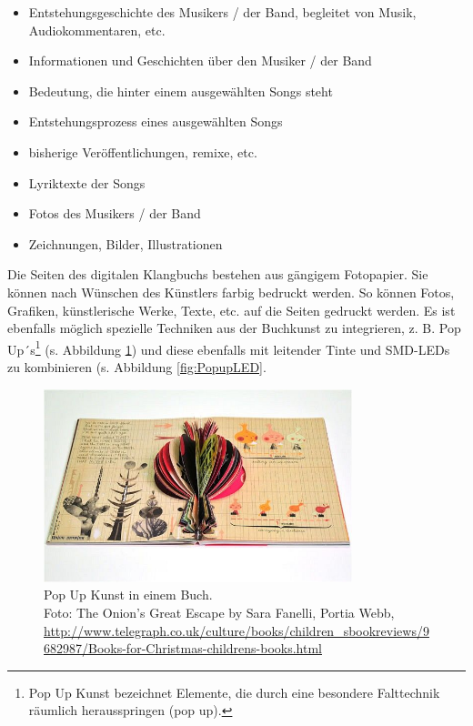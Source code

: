 \begin{itemize}
\item Entstehungsgeschichte des Musikers / der Band, begleitet von Musik, Audiokommentaren, etc.
\item Informationen und Geschichten über den Musiker / der Band
\item Bedeutung, die hinter einem ausgewählten Songs steht
\item Entstehungsprozess eines ausgewählten Songs
\item bisherige Veröffentlichungen, \gls{remix}e, etc.
\item Lyriktexte der Songs
\item Fotos des Musikers / der Band
\item Zeichnungen, Bilder, Illustrationen
\end{itemize}

Die Seiten des digitalen Klangbuchs bestehen aus gängigem Fotopapier. Sie können nach Wünschen des Künstlers farbig bedruckt werden. So können Fotos, Grafiken, künstlerische Werke, Texte, etc. auf die Seiten gedruckt werden. Es ist ebenfalls möglich spezielle Techniken aus der Buchkunst zu integrieren, z. B. Pop Up´s\footnote{Pop Up Kunst bezeichnet Elemente, die durch eine besondere Falttechnik räumlich herausspringen (pop up).} (s. Abbildung \ref{fig:Popup}) und diese ebenfalls mit leitender Tinte und SMD-LEDs zu kombinieren (s. Abbildung \ref{fig:PopupLED}.\\


\begin{figure}[H]
\centering
\includegraphics[width=0.8\textwidth]{grafiken/popup.jpg}
\caption{Pop Up Kunst in einem Buch.\\Foto: The Onion’s Great Escape by Sara Fanelli, Portia Webb, \url{http://www.telegraph.co.uk/culture/books/children_sbookreviews/9682987/Books-for-Christmas-childrens-books.html} }
\label{fig:Popup}
\end{figure}


